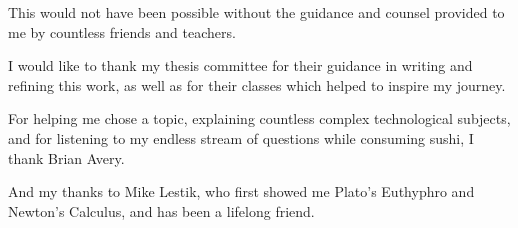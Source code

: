 This would not have been possible without the guidance and counsel provided to me by countless friends and teachers.

\vspace{1cm}

\noindent I would like to thank my thesis committee for their guidance in writing and refining this work, as well as for their classes which helped to inspire my journey.

\vspace{1cm}

\noindent For helping me chose a topic, explaining countless complex technological subjects, and for listening to my endless stream of questions while consuming sushi, I thank Brian Avery.

\vspace{1cm}

\noindent And my thanks to Mike Lestik, who first showed me Plato's Euthyphro and Newton's Calculus, and has been a lifelong friend.